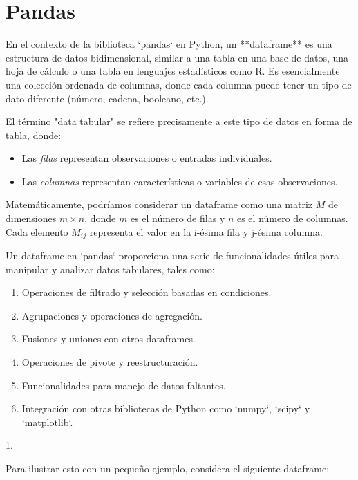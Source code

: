 \chapter{Pandas}


    En el contexto de la biblioteca `pandas` en Python, un **dataframe** es una estructura de datos bidimensional, similar a una tabla en una base de datos, una hoja de cálculo o una tabla en lenguajes estadísticos como R. Es esencialmente una colección ordenada de columnas, donde cada columna puede tener un tipo de dato diferente (número, cadena, booleano, etc.).

    El término "data tabular" se refiere precisamente a este tipo de datos en forma de tabla, donde:

    \begin{itemize}
        \item Las \textit{filas} representan observaciones o entradas individuales.
        \item Las \textit{columnas} representan características o variables de esas observaciones.
    \end{itemize}

    Matemáticamente, podríamos considerar un dataframe como una matriz \( M \) de dimensiones \( m \times n \), donde \( m \) es el número de filas y \( n \) es el número de columnas. Cada elemento \( M_{ij} \) representa el valor en la i-ésima fila y j-ésima columna.

    Un dataframe en `pandas` proporciona una serie de funcionalidades útiles para manipular y analizar datos tabulares, tales como:

    \begin{enumerate}
        \item Operaciones de filtrado y selección basadas en condiciones.
        \item Agrupaciones y operaciones de agregación.
        \item Fusiones y uniones con otros dataframes.
        \item Operaciones de pivote y reestructuración.
        \item Funcionalidades para manejo de datos faltantes.
        \item  Integración con otras bibliotecas de Python como `numpy`, `scipy` y `matplotlib`.
    \end{enumerate}1.

    Para ilustrar esto con un pequeño ejemplo, considera el siguiente dataframe:

